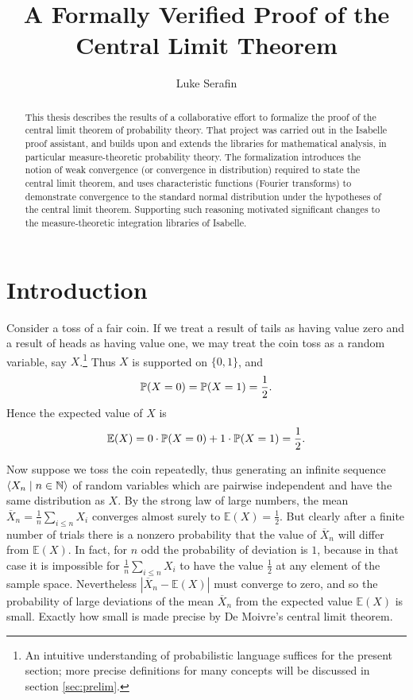 \documentclass[leqno]{article}
\title{A Formally Verified Proof of the \protect\\ Central Limit Theorem}
\author{Luke Serafin}
\theoremstyle{definition}
\newcommand{\bldseq}[2]{\langle{#1}\mid{#2}\rangle}
\renewcommand{\E}{\mathbb E}
\begin{document}
\maketitle

\begin{abstract}
This thesis describes the results of a collaborative effort to formalize the proof of the central limit theorem of probability theory. That project was carried out in the Isabelle proof assistant, and builds upon and extends the libraries for mathematical analysis, in particular measure-theoretic probability theory. The formalization introduces the notion of weak convergence (or convergence in distribution) required to state the central limit theorem, and uses characteristic functions (Fourier transforms) to demonstrate convergence to the standard normal distribution under the hypotheses of the central limit theorem. Supporting such reasoning motivated significant changes to the measure-theoretic integration libraries of Isabelle.
\end{abstract}

\tableofcontents

\newpage

\section{Introduction}

Consider a toss of a fair coin. If we treat a result of tails as having value zero and a result of heads as having value one, we may treat the coin toss as a random variable, say $X$.\footnote{An intuitive understanding of probabilistic language suffices for the present section; more precise definitions for many concepts will be discussed in section \ref{sec:prelim}.} Thus $X$ is supported on $\{0,1\}$, and
\[ \P(X = 0) = \P(X = 1) = \frac{1}{2}. \]
Hence the expected value of $X$ is
\[ \E(X) = 0 \cdot \P(X = 0) + 1 \cdot \P(X = 1) = \frac{1}{2}. \]

Now suppose we toss the coin repeatedly, thus generating an infinite sequence $\bldseq{X_n}{n \in \N}$ of random variables which are pairwise independent and have the same distribution as $X$. By the strong law of large numbers, the mean $\overline X_n = \frac{1}{n} \sum_{i \le n} X_i$ converges almost surely to $\E(X) = \frac{1}{2}$. But clearly after a finite number of trials there is a nonzero probability that the value of $\overline X_n$ will differ from $\E(X)$. In fact, for $n$ odd the probability of deviation is $1$, because in that case it is impossible for $\frac{1}{n} \sum_{i \le n} X_i$ to have the value $\frac{1}{2}$ at any element of the sample space. Nevertheless $|\overline X_n - \E(X)|$ must converge to zero, and so the probability of large deviations of the mean $\overline X_n$ from the expected value $\E(X)$ is small. Exactly how small is made precise by De Moivre's central limit theorem.
\end{document}
